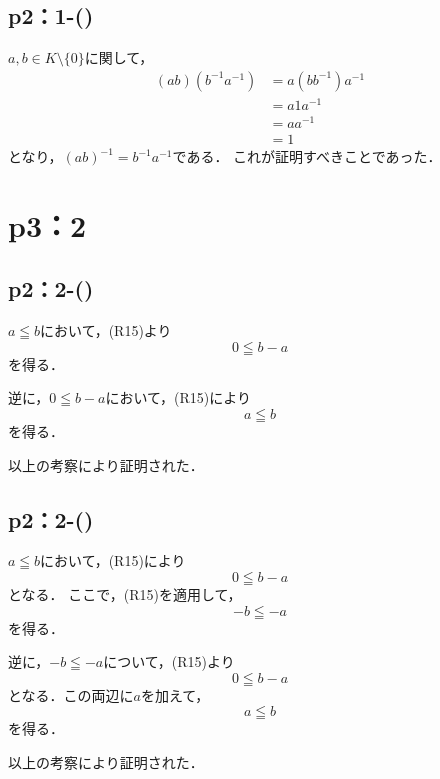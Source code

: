 \subsection*{p2：1-()}
\begin{tproof}
    $ a ,b\in K \setminus \{ 0 \} $に関して，
    \begin{align*}
        (ab) (b^{-1} a^{-1}) & = a (bb^{-1}) a^{-1} \\
                             & = a1a^{-1}           \\
                             & = aa^{-1}            \\
                             & = 1
    \end{align*}
    となり，$(ab)^{-1} = b^{-1} a^{-1}$である．
    これが証明すべきことであった．
\end{tproof}
%

\section*{p3：2}

\subsection*{p2：2-()}
\begin{tproof}
    $a \leqq b$において，(R15)より
    \[
        0 \leqq b-a
    \]
    を得る．

    逆に，$0 \leqq b-a$において，(R15)により
    \[
        a \leqq b
    \]
    を得る．

    以上の考察により証明された．
\end{tproof}

\subsection*{p2：2-()}
\begin{tproof}
    $a \leqq b$において，(R15)により
    \[
        0 \leqq b-a
    \]
    となる．
    ここで，(R15)を適用して，
    \[
        -b \leqq -a
    \]
    を得る．

    逆に，$-b\leqq -a$について，(R15)より
    \[
        0 \leqq b -a
    \]
    となる．この両辺に$a$を加えて，
    \[
        a \leqq b
    \]
    を得る．

    以上の考察により証明された．
\end{tproof}



